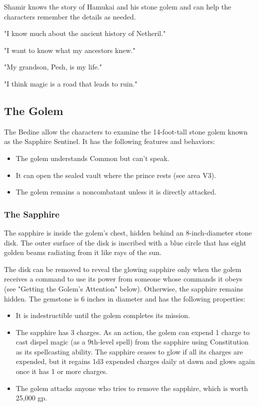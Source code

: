\documentclass[10pt,a4paper,twoside,bg=print,twocolumn,openany,nodeprecatedcode]{dndbook}
\begin{document}
Shamir knows the story of Hamukai and his stone golem and can help the characters remember the details as needed.


\begin{description}[nolistsep]
\item[Personality Trait]
"I know much about the ancient history of Netheril."
\item[Ideal]
"I want to know what my ancestors knew."
\item[Bond]
"My grandson, Pesh, is my life."
\item[Flaw]
"I think magic is a road that leads to ruin."
\end{description}

\subsection{The Golem}
The Bedine allow the characters to examine the 14-foot-tall stone golem known as the Sapphire Sentinel. It has the following features and behaviors:


\begin{itemize}
\item The golem understands Common but can't speak.
\item It can open the sealed vault where the prince rests (see area V3).
\item The golem remains a noncombatant unless it is directly attacked.
\end{itemize}

\subsubsection{The Sapphire}
The sapphire is inside the golem's chest, hidden behind an 8-inch-diameter stone disk. The outer surface of the disk is inscribed with a blue circle that has eight golden beams radiating from it like rays of the sun.

The disk can be removed to reveal the glowing sapphire only when the golem receives a command to use its power from someone whose commands it obeys (see "Getting the Golem's Attention" below). Otherwise, the sapphire remains hidden. The gemstone is 6 inches in diameter and has the following properties:


\begin{itemize}
\item It is indestructible until the golem completes its mission.
\item The sapphire has 3 charges. As an action, the golem can expend 1 charge to cast dispel magic (as a 9th-level spell) from the sapphire using Constitution as its spellcasting ability. The sapphire ceases to glow if all its charges are expended, but it regains 1d3 expended charges daily at dawn and glows again once it has 1 or more charges.
\item The golem attacks anyone who tries to remove the sapphire, which is worth 25,000 gp.
\end{itemize}
\end{document}
